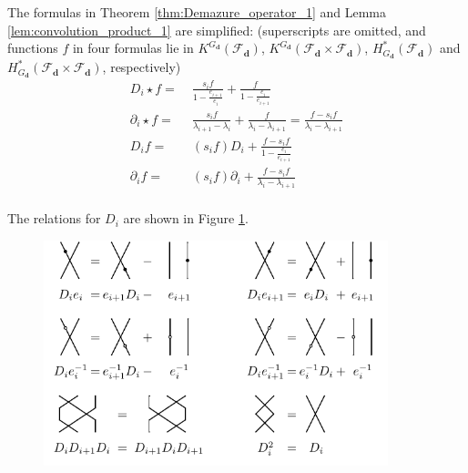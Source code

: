 \documentclass[reqno,11pt]{book}
\numberwithin{equation}{section}
\theoremstyle{plain}
\theoremstyle{plain}
\numberwithin{equation}{section}
\theoremstyle{remark}
\newcommand{\dimvec}[1]{\mathbf{#1}}
\begin{document}
The formulas in Theorem \ref{thm:Demazure_operator_1} and Lemma \ref{lem:convolution_product_1} are simplified: (superscripts are omitted, and functions $f$ in four formulas lie in $K^{G_{\dimvec{d}}} (\mathcal{F}_{\dimvec{d}})$, $K^{G_{\dimvec{d}}} (\mathcal{F}_{\dimvec{d}} \times  \mathcal{F}_{\dimvec{d}})$, $H_{G_{\dimvec{d}}}^{*}(\mathcal{F}_{\dimvec{d}})$ and $H_{G_{\dimvec{d}}}^{*}(\mathcal{F}_{\dimvec{d}} \times  \mathcal{F}_{\dimvec{d}})$, respectively)
\begin{equation*}
\begin{aligned}
  D_i \star f =\;& \frac{s_i f}{1- \frac{e_{i+1}}{e_i}} + \frac{f}{1- \frac{e_{i}}{e_{i+1}}}\\ 
  \partial_i \star f =\;& \frac{s_i f}{\lambda_{i+1}-\lambda_{i}}+\frac{ f}{\lambda_{i}-\lambda_{i+1}}=\frac{f -s_i f}{\lambda_{i}-\lambda_{i+1}}\\
  D_i f =\;& (s_i f) D_i + \frac{f- s_i f}{1- \frac{e_{i}}{e_{i+1}}}\\ 
  \partial_i f =\;& (s_i f) \partial_i + \frac{f- s_i f}{\lambda_{i}-\lambda_{i+1}}\\   
\end{aligned}
\end{equation*}

The relations for $D_i$ are shown in Figure \ref{fig:relations_1}.
\begin{figure}[ht]
  \vspace{0cm}
    \centering  \includegraphics[width=10cm]{figures/strands/relations_1.pdf}
    \caption{}
      \label{fig:relations_1}        
\end{figure}
\end{document}
